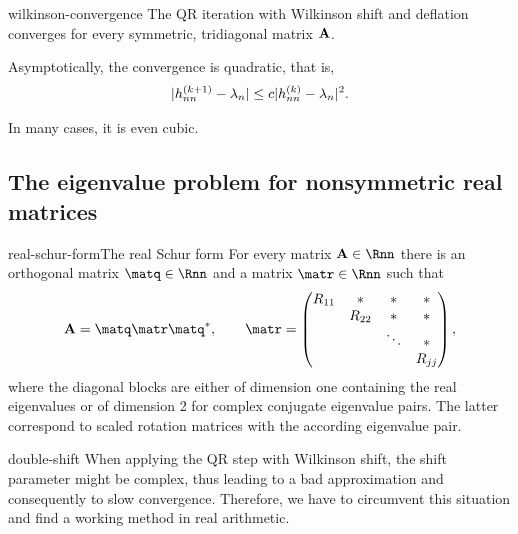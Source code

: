 \begin{Theorem}{wilkinson-convergence}
  The QR iteration with Wilkinson shift and deflation converges for
  every symmetric, tridiagonal matrix $\mathbf A$.

  Asymptotically, the convergence is quadratic, that is,
  \begin{gather}
    \lvert h_{nn}^{(k+1)} - \lambda_n\rvert \le c \lvert h_{nn}^{(k)} - \lambda_n\rvert^2.
  \end{gather}

  In many cases, it is even cubic.
\end{Theorem}

\subsection{The eigenvalue problem for nonsymmetric real matrices}

\begin{Theorem*}{real-schur-form}{The real Schur form}
  For every matrix $\mata\in \Rnn$ there is an orthogonal matrix
  $\matq\in\Rnn$ and a matrix $\matr\in\Rnn$ such that
  \begin{gather}
    \mata = \matq\matr\matq^*,
    \qquad
    \matr =
    \begin{pmatrix}
      R_{11} &* & *&*\\
      &R_{22}&*&*\\
      &&\ddots&*\\
      &&& R_{jj}
    \end{pmatrix},
  \end{gather}
  where the diagonal blocks are either of dimension one containing the
  real eigenvalues or of dimension 2 for complex conjugate eigenvalue
  pairs. The latter correspond to scaled rotation matrices with the
  according eigenvalue pair.
\end{Theorem*}

\begin{intro}{double-shift}
  When applying the QR step with Wilkinson shift, the shift parameter
  might be complex, thus leading to a bad approximation and
  consequently to slow convergence. Therefore, we have to circumvent
  this situation and find a working method in real arithmetic. 
\end{intro}

